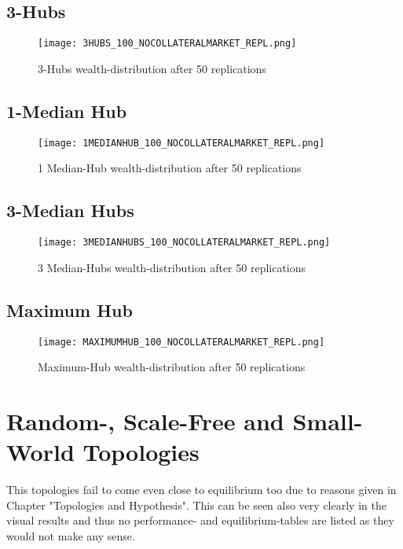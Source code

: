 \documentclass[Bachelorarbeit.tex]{subfiles}
\begin{document}
\subsection{3-Hubs}
\begin{figure}[!htbp]
	\centering
  \texttt{[image: 3HUBS\_100\_NOCOLLATERALMARKET\_REPL.png]}
	\caption{3-Hubs wealth-distribution after 50 replications}
	\label{fig1}
\end{figure}

\subsection{1-Median Hub}
\begin{figure}[!htbp]
	\centering
  \texttt{[image: 1MEDIANHUB\_100\_NOCOLLATERALMARKET\_REPL.png]}
	\caption{1 Median-Hub wealth-distribution after 50 replications}
	\label{fig1}
\end{figure}

\subsection{3-Median Hubs}
\begin{figure}[!htbp]
	\centering
  \texttt{[image: 3MEDIANHUBS\_100\_NOCOLLATERALMARKET\_REPL.png]}
	\caption{3 Median-Hubs wealth-distribution after 50 replications}
	\label{fig1}
\end{figure}

\subsection{Maximum Hub}
\begin{figure}[!htbp]
	\centering
  \texttt{[image: MAXIMUMHUB\_100\_NOCOLLATERALMARKET\_REPL.png]}
	\caption{Maximum-Hub wealth-distribution after 50 replications}
	\label{fig1}
\end{figure}

\section{Random-, Scale-Free and Small-World Topologies}
This topologies fail to come even close to equilibrium too due to reasons given in Chapter "Topologies and Hypothesis". This can be seen also very clearly in the visual results and thus no performance- and equilibrium-tables are listed as they would not make any sense.
\end{document}
